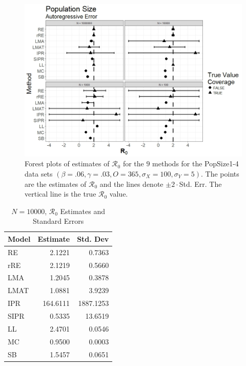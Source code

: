 \documentclass[12pt]{article}
\newcommand{\xxsir}{\ensuremath{9} } %
\newcommand{\rr}{\ensuremath{\mathcal{R}_0}}
\begin{document}
\begin{figure}[H]
	\centering
	\includegraphics[scale=0.5]{images/popsize_ar.jpeg}
	\caption{Forest plots of estimates of $\rr$ for the \xxsir methods for the PopSize1-4 data sets $(\beta=.06, \gamma=.03, O=365, \sigma_X=100, \sigma_Y=5)$.  The points are the estimates of $\rr$ and the lines denote $\pm 2\cdot $Std. Err.  The vertical line is the true $\rr$ value.}
\end{figure}

\begin{table}[H]
	
	\centering
	\begin{tabular}[t]{l|r|r}
		\hline
		Model & Estimate & Std. Dev\\
		\hline
		RE & 2.1221 & 0.7363\\
		\hline
		rRE & 2.1219 & 0.5660\\
		\hline
		LMA & 1.2045 & 0.3878\\
		\hline
		LMAT & 1.0881 & 3.9239\\
		\hline
		IPR & 164.6111 & 1887.1253\\
		\hline
		SIPR & 0.5335 & 13.6519\\
		\hline
		LL & 2.4701 & 0.0546\\
		\hline
		MC & 0.9500 & 0.0003\\
		\hline
		SB & 1.5457 & 0.0651\\
		\hline
	\end{tabular}
	\caption{$N = 10000$, $\rr$ Estimates and Standard Errors}
\end{table}
\end{document}
